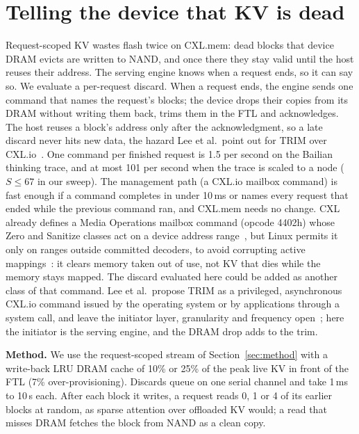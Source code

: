 \documentclass[acmsmall,screen,review]{acmart}
\begin{document}
\section{Telling the device that KV is dead}
\label{sec:discard}
Request-scoped KV wastes flash twice on CXL.mem: dead blocks that device DRAM evicts are written to
NAND, and once there they stay valid until the host reuses their address. The serving engine knows
when a request ends, so it can say so. We evaluate a per-request discard. When a request ends, the
engine sends one command that names the request's blocks; the device drops their copies from its
DRAM without writing them back, trims them in the FTL and acknowledges. The host reuses a block's
address only after the acknowledgment, so a late discard never hits new data, the hazard Lee et al.\
point out for TRIM over CXL.io~\cite{trimcxl}. One command per finished request is 1.5
per second on the Bailian thinking trace, and at most 101 per second when the trace is scaled
to a node ($S \le 67$ in our sweep). The management path (a CXL.io mailbox command) is fast enough
if a command completes in under 10\,ms or names every request that ended while the previous command
ran, and CXL.mem needs no change. CXL already
defines a Media Operations mailbox command (opcode 4402h) whose Zero and Sanitize classes act on a
device address range~\cite{cxl40}, but Linux permits it only on ranges outside committed decoders, to
avoid corrupting active mappings~\cite{linux_mediaop}: it clears memory taken out of use, not KV that
dies while the memory stays mapped. The discard evaluated here could be added as another class of
that command. Lee
et al.\ propose TRIM as a privileged, asynchronous CXL.io command issued by the operating system or
by applications through a system call, and leave the initiator layer, granularity and frequency
open~\cite{trimcxl}; here the initiator is the serving
engine, and the DRAM drop adds to the trim.

\textbf{Method.} We use the request-scoped stream of Section~\ref{sec:method} with a write-back LRU
DRAM cache of 10\% or 25\% of the peak live KV in front of the FTL (7\% over-provisioning).
Discards queue on one serial channel and take 1\,ms to 10\,s each. After each block it writes, a
request reads 0, 1 or 4 of its earlier blocks at random, as sparse attention over offloaded KV would;
a read that misses DRAM fetches the block from NAND as a clean copy.
\end{document}
